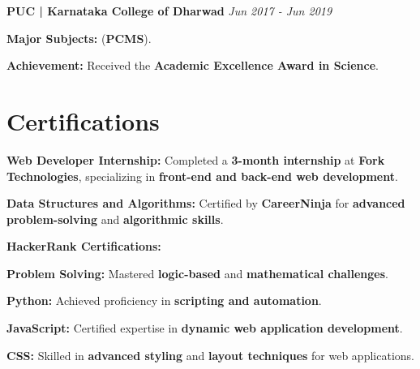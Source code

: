 \documentclass[a4paper,11pt]{article}
\begin{document}
\textbf{PUC | Karnataka College of Dharwad} \hfill \textit{Jun 2017 - Jun 2019} \\
\begin{compactitem}
    \item \textbf{Major Subjects:} (\textbf{PCMS}).
    \item \textbf{Achievement:} Received the \textbf{Academic Excellence Award in Science}.
\end{compactitem}

\section*{Certifications}
\begin{compactitem}
    \item \textbf{Web Developer Internship:} Completed a \textbf{3-month internship} at \textbf{Fork Technologies}, specializing in \textbf{front-end and back-end web development}.
    \item \textbf{Data Structures and Algorithms:} Certified by \textbf{CareerNinja} for \textbf{advanced problem-solving} and \textbf{algorithmic skills}.
    \item \textbf{HackerRank Certifications:}
    \begin{compactitem}
        \item \textbf{Problem Solving:} Mastered \textbf{logic-based} and \textbf{mathematical challenges}.
        \item \textbf{Python:} Achieved proficiency in \textbf{scripting and automation}.
        \item \textbf{JavaScript:} Certified expertise in \textbf{dynamic web application development}.
        \item \textbf{CSS:} Skilled in \textbf{advanced styling} and \textbf{layout techniques} for web applications.
    \end{compactitem}
\end{compactitem}
\end{document}
